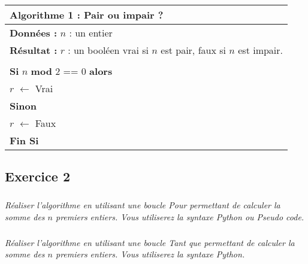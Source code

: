 \documentclass[10pt]{article}
\newif\ifprof
\begin{document}
\ifprof
\begin{py}
\begin{python}
# Exercice 1
def is_even(n):
    """
    Fonction permettant de savoir si un nombre est pair ou impair
    Entrées : 
     * n(int) : nombre entier
    Sorties : 
     * un booleén valant True si le nombre est pair, False sinon
    """
    return n%
\end{python}
\end{py}
\else
\begin{pseudo}
\begin{center}
\begin{tabular}{p{}}
\hline
\textbf{Algorithme 1 :} Pair ou impair ? \\
\hline
\textbf{Données :} $n$ : un entier \\
\textbf{Résultat :} $r$ : un booléen vrai si $n$ est pair, faux si $n$ est impair. \\
\\
\textbf{Si} $n$ \textbf{mod} 2 == 0 \textbf{alors} \\
\hspace{.4cm} $r$ $\leftarrow$ Vrai \\
\textbf{Sinon} \\
\hspace{.4cm} $r$ $\leftarrow$ Faux \\
\textbf{Fin Si} \\
\hline
\end{tabular}
\end{center}
\end{pseudo}
\fi

\subsection*{Exercice 2}
\setcounter{subparagraph}{0}
\subparagraph{}\textit{Réaliser l'algorithme en utilisant une boucle \textsf{Pour} permettant de calculer la somme des $n$ premiers entiers. Vous utiliserez la syntaxe Python ou Pseudo code.}

\subparagraph{}\textit{Réaliser l'algorithme en utilisant une boucle \textsf{Tant que} permettant de calculer la somme des $n$ premiers entiers. Vous utiliserez la syntaxe Python.}
\end{document}
